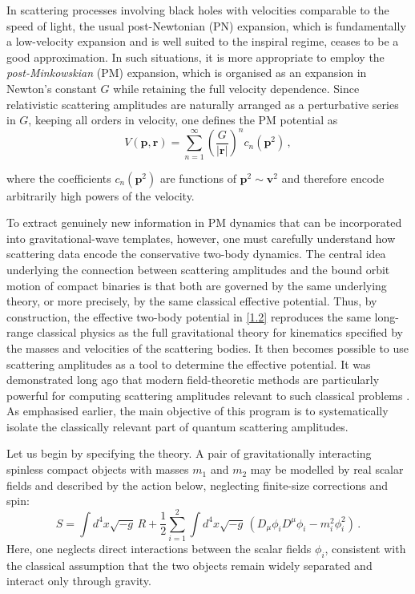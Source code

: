 \vspace{0.5 cm}
In scattering processes involving black holes with velocities comparable to the speed of light, the usual post-Newtonian (PN) expansion, which is fundamentally a low-velocity expansion and is well suited to the inspiral regime, ceases to be a good approximation. In such situations, it is more appropriate to employ the \emph{post-Minkowskian} (PM) expansion, which is organised as an expansion in Newton's constant $G$ while retaining the full velocity dependence. Since relativistic scattering amplitudes are naturally arranged as a perturbative series in $G$, keeping all orders in velocity, one defines the PM potential as
\begin{equation}
V(\boldsymbol{p},\boldsymbol{r})=\sum_{n=1}^\infty \left(\frac{G}{|\boldsymbol{r}|}\right)^n c_n(\boldsymbol{p}^2)\, ,
    \label{1.2}
\end{equation}

where the coefficients $c_n(\boldsymbol{p}^2)$ are functions of $\boldsymbol{p}^2 \sim \boldsymbol{v}^2$ and therefore encode arbitrarily high powers of the velocity.


To extract genuinely new information in PM dynamics that can be incorporated into gravitational-wave templates, however, one must carefully understand how scattering data encode the conservative two-body dynamics. The central idea underlying the connection between scattering amplitudes and the bound orbit motion of compact binaries is that both are governed by the same underlying theory, or more precisely, by the same classical effective potential. Thus, by construction, the effective two-body potential in \eqref{1.2} reproduces the same long-range classical physics as the full gravitational theory for kinematics specified by the masses and velocities of the scattering bodies. It then becomes possible to use scattering amplitudes as a tool to determine the effective potential. It was demonstrated long ago that modern field-theoretic methods are particularly powerful for computing scattering amplitudes relevant to such classical problems \cite{Holstein:2004dn}. As emphasised earlier, the main objective of this program is to systematically isolate the classically relevant part of quantum scattering amplitudes.

Let us begin by specifying the theory. A pair of gravitationally interacting spinless compact objects with masses $m_1$ and $m_2$ may be modelled by real scalar fields and described by the action below, neglecting finite-size corrections and spin:
\begin{equation}
        S=\int d^4x \sqrt{-g}\,R
        +\frac{1}{2}\sum_{i=1}^2 \int d^4x \sqrt{-g}\,
        \left(D_\mu \phi_i D^\mu \phi_i - m_i^2 \phi_i^2\right)\, .
\end{equation}
Here, one neglects direct interactions between the scalar fields $\phi_i$, consistent with the classical assumption that the two objects remain widely separated and interact only through gravity.

